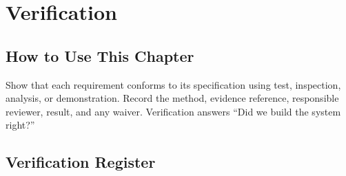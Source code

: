 \chapter{Verification}
\section{How to Use This Chapter}
Show that each requirement conforms to its specification using test, inspection, analysis, or demonstration. Record the method, evidence reference, responsible reviewer, result, and any waiver.
Verification answers ``Did we build the system right?''

\section{Verification Register}
\small
